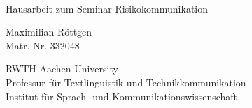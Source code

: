 \documentclass[fontsize=13pt,a4paper]{article}
\begin{document}
\thispagestyle{empty}

{%
 \sffamily
 \centering
 \Large

 ~\vspace{\fill}

 {\huge
  Hausarbeit zum Seminar Risikokommunikation}

 \vspace{2.5cm}

 {\large
  Maximilian Röttgen
 }\\
 Matr. Nr. 332048

 \vspace{3.5cm}

 RWTH-Aachen University\\
 Professur für Textlinguistik und Technikkommunikation\\
 Institut für Sprach- und Kommunikationswissenschaft

 \vspace{3.5cm}

\vspace{\fill}


}%
\clearpage
\sffamily

\tableofcontents
\end{document}

